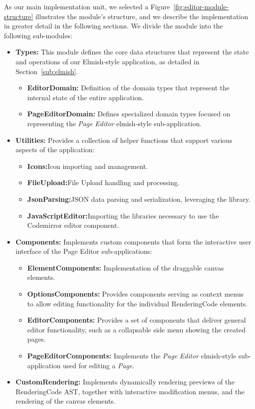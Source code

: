 As our main implementation unit, we selected a
Figure~\ref{fig:editor-module-structure} illustrates the module's structure, and we describe the implementation in greater detail in the following sections.
We divide the module into the following sub-modules:
\begin{itemize}
	\item \textbf{Types:} This module defines the core data structures that represent the state and operations of our Elmish-style application, as detailed in Section~\ref{sub:elmish}.
	      \begin{itemize}
		      \item \textbf{EditorDomain:} Definition of the domain types that represent the internal state of the entire application.
		      \item \textbf{PageEditorDomain:} Defines specialized domain types focused on representing the \emph{Page Editor} elmish-style sub-application.
	      \end{itemize}

	\item \textbf{Utilities:} Provides a collection of helper functions that support various aspects of the application:
	      \begin{itemize}
		      \item \textbf{Icons:}Icon importing and management.
		      \item \textbf{FileUpload:}File Upload handling and processing.
		      \item \textbf{JsonParsing:}JSON data parsing and serialization, leveraging the \citet{simpleJson} library.
		      \item \textbf{JavaScriptEditor:}Importing the libraries necessary to use the Codemirror editor component.
	      \end{itemize}


	\item \textbf{Components:} Implements custom components that form the interactive user interface of the Page Editor sub-applications:
	      \begin{itemize}
		      \item \textbf{ElementComponents:} Implementation of the draggable canvas elements.
		      \item \textbf{OptionsComponents:} Provides components serving as context menus to allow editing functionality for the individual RenderingCode elements.
		      \item \textbf{EditorComponents:} Provides a set of components that deliver general editor functionality, such as a collapsable side menu showing the created pages.
		      \item \textbf{PageEditorComponents:} Implements the \emph{Page Editor} elmish-style sub-application used for editing a \emph{Page}.
	      \end{itemize}
	\item \textbf{CustomRendering:} Implements dynamically rendering previews of the RenderingCode AST, together with interactive modification menus, and the rendering of the canvas elements.
\end{itemize}


